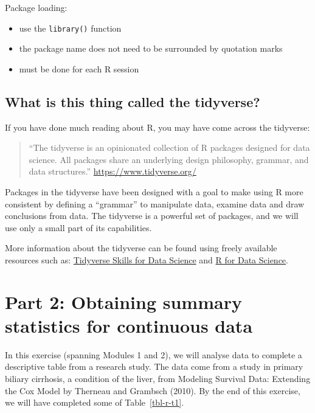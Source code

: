 \documentclass[
  a4paper,
]{memoir}
\providecommand{\tightlist}{%
  \setlength{\itemsep}{0pt}\setlength{\parskip}{0pt}}
\begin{document}
Package loading:

\begin{itemize}
\tightlist
\item
  use the \texttt{library()} function
\item
  the package name does not need to be surrounded by quotation marks
\item
  must be done for each R session
\end{itemize}

\subsection{What is this thing called the
tidyverse?}\label{what-is-this-thing-called-the-tidyverse}

If you have done much reading about R, you may have come across the
tidyverse:

\begin{quote}
``The tidyverse is an opinionated collection of R packages designed for
data science. All packages share an underlying design philosophy,
grammar, and data structures.'' \url{https://www.tidyverse.org/}
\end{quote}

Packages in the tidyverse have been designed with a goal to make using R
more consistent by defining a ``grammar'' to manipulate data, examine
data and draw conclusions from data. The tidyverse is a powerful set of
packages, and we will use only a small part of its capabilities.

More information about the tidyverse can be found using freely available
resources such as:
\href{https://jhudatascience.org/tidyversecourse/}{Tidyverse Skills for
Data Science} and \href{https://r4ds.had.co.nz/}{R for Data Science}.

\section{Part 2: Obtaining summary statistics for continuous
data}\label{part-2-obtaining-summary-statistics-for-continuous-data-1}

In this exercise (spanning Modules 1 and 2), we will analyse data to
complete a descriptive table from a research study. The data come from a
study in primary biliary cirrhosis, a condition of the liver, from
Modeling Survival Data: Extending the Cox Model by Therneau and Grambsch
(2010). By the end of this exercise, we will have completed some of
Table~\ref{tbl-r-t1}.
\end{document}
